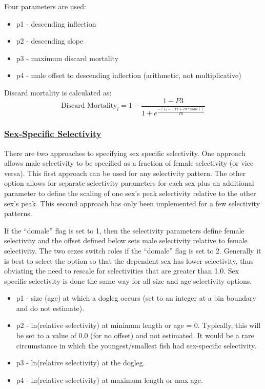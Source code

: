 Four parameters are used:
\begin{itemize}
	\item p1 - descending inflection
	\item p2 - descending slope
	\item p3 - maximum discard mortality
	\item p4 - male offset to descending inflection (arithmetic, not multiplicative)
\end{itemize}

Discard mortality is calculated as:
\begin{equation}
	\text{Discard Mortality}_l = 1 - \frac{1-P3}{1+e^{\frac{-(L_l-(P1+P4*male))}{P2}}}
\end{equation}

\hypertarget{SexSelex}{}
\subsubsection[Sex-Specific Selectivity]{\protect\hyperlink{SexSelex}{Sex-Specific Selectivity}}
There are two approaches to specifying sex specific selectivity. One approach allows male selectivity to be specified as a fraction of female selectivity (or vice versa). This first approach can be used for any selectivity pattern. The other option allows for separate selectivity parameters for each sex plus an additional parameter to define the scaling of one sex's peak selectivity relative to the other sex's peak. This second approach has only been implemented for a few selectivity patterns.

If the ``domale'' flag is set to 1, then the selectivity parameters define female selectivity and the offset defined below sets male selectivity relative to female selectivity. The two sexes switch roles if the ``domale'' flag is set to 2. Generally it is best to select the option so that the dependent sex has lower selectivity, thus obviating the need to rescale for selectivities that are greater than 1.0. Sex specific selectivity is done the same way for all size and age selectivity options.
\begin{itemize}
	\item p1 - size (age) at which a dogleg occurs (set to an integer at a bin boundary and do not estimate).
	\item p2 - ln(relative selectivity) at minimum length or age = 0. Typically, this will be set to a value of 0.0 (for no offset) and not estimated. It would be a rare circumstance in which the youngest/smallest fish had sex-specific selectivity.
	\item p3 - ln(relative selectivity) at the dogleg.
	\item p4 - ln(relative selectivity) at maximum length or max age.
\end{itemize}

